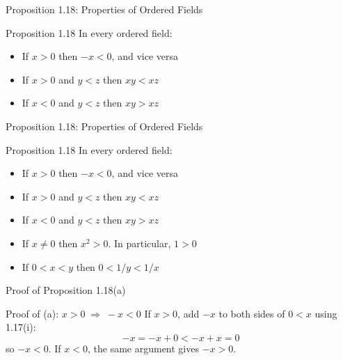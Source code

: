 \documentclass[aspectratio=169,12pt,t]{beamer}
\begin{document}
{%
\begin{frame}{Proposition 1.18: Properties of Ordered Fields}
  \begin{thmblock}{Proposition 1.18}
    In every ordered field:
    \begin{itemize}
      \item[(a)] If $x > 0$ then $-x < 0$, and vice versa
      \item[(b)] If $x > 0$ and $y < z$ then $xy < xz$
      \item[(c)] If $x < 0$ and $y < z$ then $xy > xz$
    \end{itemize}
  \end{thmblock}

\end{frame}

\begin{frame}{Proposition 1.18: Properties of Ordered Fields}
  \begin{thmblock}{Proposition 1.18}
    In every ordered field:
    \begin{itemize}
      \item[(a)] If $x > 0$ then $-x < 0$, and vice versa
      \item[(b)] If $x > 0$ and $y < z$ then $xy < xz$
      \item[(c)] If $x < 0$ and $y < z$ then $xy > xz$
      \item[(d)] If $x \neq 0$ then $x^2 > 0$. In particular, $1 > 0$
      \item[(e)] If $0 < x < y$ then $0 < 1/y < 1/x$
    \end{itemize}
  \end{thmblock}

\end{frame}

\begin{frame}{Proof of Proposition 1.18(a)}
  \begin{proofblock}{Proof of (a): $x > 0 \;\Longrightarrow\; -x < 0$}
    If $x > 0$, add $-x$ to both sides of $0 < x$ using 1.17(i):
    \[
      -x = -x + 0 < -x + x = 0
    \]
    so $-x < 0$. If $x < 0$, the same argument gives $-x > 0$.
  \end{proofblock}


\end{frame}}
\end{document}
